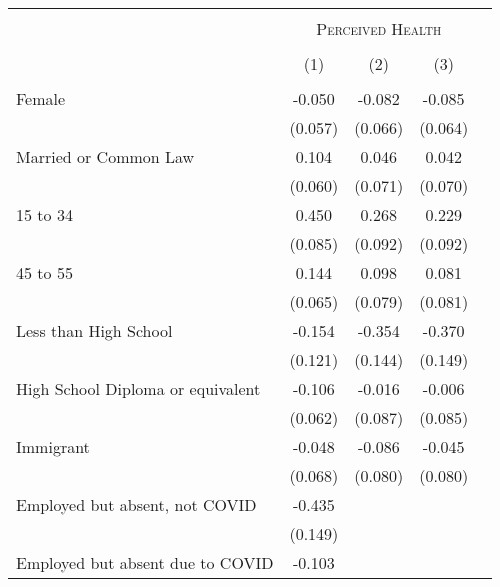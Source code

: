 \begin{tabular*}{\textwidth}{ @{\extracolsep{\fill}}l*{4}{c}}
\hline\hline
\\
& \multicolumn{3}{c}{ \textsc{Perceived Health} } \\
\cline{2-4} \\
                                                  &\multicolumn{1}{c}{(1)}&\multicolumn{1}{c}{(2)}&\multicolumn{1}{c}{(3)}\\
\hline
\\
Female                                            &   -0.050&   -0.082&   -0.085\\
                                                  &  (0.057)&  (0.066)&  (0.064)\\[0.5em]
Married or Common Law                             &    0.104&    0.046&    0.042\\
                                                  &  (0.060)&  (0.071)&  (0.070)\\[0.5em]
15 to 34                                          &    0.450&    0.268&    0.229\\
                                                  &  (0.085)&  (0.092)&  (0.092)\\[0.5em]
45 to 55                                          &    0.144&    0.098&    0.081\\
                                                  &  (0.065)&  (0.079)&  (0.081)\\[0.5em]
Less than High School                             &   -0.154&   -0.354&   -0.370\\
                                                  &  (0.121)&  (0.144)&  (0.149)\\[0.5em]
High School Diploma or equivalent                 &   -0.106&   -0.016&   -0.006\\
                                                  &  (0.062)&  (0.087)&  (0.085)\\[0.5em]
Immigrant                                         &   -0.048&   -0.086&   -0.045\\
                                                  &  (0.068)&  (0.080)&  (0.080)\\[0.5em]
Employed but absent, not COVID                    &   -0.435&         &         \\
                                                  &  (0.149)&         &         \\[0.5em]
Employed but absent due to COVID                  &   -0.103&         &         \\

\end{tabular*}
